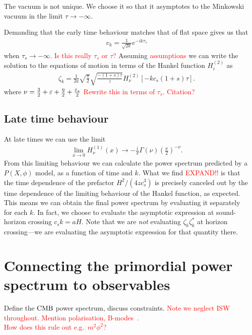     The vacuum is not unique. We choose it so that it
    asymptotes to the Minkowski vacuum in the limit $\tau\to-\infty$.

    Demanding that the early time behaviour matches that of flat space
    gives us that
    \begin{align}
        v_k = \frac{1}{\sqrt{2k}}e^{-ik\tau_s}
    \end{align}
    when $\tau_s\rightarrow -\infty$.
    \textcolor{red}{Is this really $\tau_s$ or $\tau$?}
    Assuming \textcolor{red}{assumptions} we can write the solution to the equations
    of motion in terms of the Hankel function $H^{(2)}_i$ as~\cite{px_burrage}
    \begin{align}
        \zeta_k = \frac{1}{2a}\sqrt{\frac{\pi}{2}}\sqrt{\frac{-(1+s)\tau}{z}}H^{(2)}_{\nu}\left[-kc_s(1+s)\tau\right].
    \end{align}
    where $\nu = \frac{3}{2}+\varepsilon+\frac{\eta}{2}+\frac{\varepsilon_{s}}{2}$
    \textcolor{red}{Rewrite this in terms of $\tau_s$. Citation?}

    \subsection{Late time behaviour}
    At late times we can use the limit
    \begin{align}
        \lim_{x\rightarrow 0}H^{(1)}_\nu(x)\rightarrow-\frac{i}{\pi}\Gamma(\nu)\left(\frac{x}{2}\right)^{-\nu}.
    \end{align}
    From this limiting behaviour we can calculate the power spectrum predicted by
    a $P(X,\phi)$ model, as a function of time and $k$.
    What we find \textcolor{red}{EXPAND!!} is that the time dependence
    of the prefactor $H^2/(4zc_s^3)$ is precisely canceled out by the time dependence
    of the limiting behaviour of the Hankel function, as expected.
    This means we can obtain the final power spectrum by evaluating
    it separately for each $k$. In fact, we choose to evaluate the asymptotic expression
    at sound-horizon crossing $c_sk=aH$. Note that we are \textit{not} evaluating
    $\zeta_k\zeta^*_k$ at horizon crossing---we are evaluating the asymptotic expression
    for that quantity there.


    \section{Connecting the primordial power spectrum to observables}
    Define the $\text{CMB}$ power spectrum, discuss constraints.
    \textcolor{red}{Note we neglect ISW throughout. Mention polarisation, B-modes~\cite{Baumann_bmodes_2014}.\\
    How does this rule out e.g.\ $m^2\phi^2$?}


